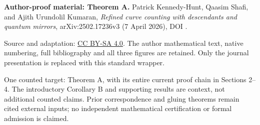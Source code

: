 \noindent\textbf{Author-proof material: Theorem A.} Patrick Kennedy-Hunt, Qaasim Shafi, and Ajith Urundolil Kumaran, \emph{Refined curve counting with descendants and quantum mirrors}, arXiv:2502.17236v3 (7 April 2026), DOI .

\noindent Source and adaptation: \href{https://creativecommons.org/licenses/by-sa/4.0/}{CC BY-SA 4.0}. The author mathematical text, native numbering, full bibliography and all three figures are retained. Only the journal presentation is replaced with this standard wrapper.

\noindent One counted target: Theorem A, with its entire current proof chain in Sections 2--4. The introductory Corollary B and supporting results are context, not additional counted claims. Prior correspondence and gluing theorems remain cited external inputs; no independent mathematical certification or formal admission is claimed.

